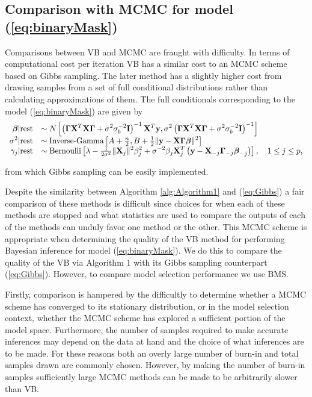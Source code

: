 \documentclass[11pt]{article}
\newtheorem{Main Result}{Main Result}
\def\vectorfontone{\bf}
\def\vectorfonttwo{\boldsymbol}
\def\vy{{\vectorfontone y}}                      %
\def\vbeta{{\vectorfonttwo \beta}}               %
\def\matrixfontone{\bf}
\def\matrixfonttwo{\boldsymbol}
\def\mI{{\matrixfontone I}}                      %
\def\mX{{\matrixfontone X}}                      %
\def\mGamma{{\matrixfonttwo \Gamma}}             %
\def\ds{\displaystyle}
\newcommand{\joc}[1]{{\color{black}#1}}
\begin{document}
 

 
\subsection{Comparison with MCMC for model (\ref{eq:binaryMask})}
\label{sec:Comparison}

Comparisons between VB and MCMC are fraught with difficulty. In terms of
computational cost per iteration VB has a similar cost to an MCMC scheme based
on Gibbs sampling. The later method has a slightly higher cost from drawing
samples from a set of full conditional distributions rather than calculating
approximations of them. The full conditionals corresponding to the model
(\ref{eq:binaryMask}) are given by
\begin{equation}\label{eq:Gibbs}
\begin{array}{rl}
\ds \vbeta|\mbox{rest}
    & \ds \sim N\left[
\left( \mGamma\mX^T\mX\mGamma + \sigma^2\sigma_b^{-2}\mI \right)^{-1}\mX^T\vy, \sigma^2\left( \mGamma\mX^T\mX\mGamma + \sigma^2\sigma_b^{-2}\mI \right)^{-1}
\right]
\\
\ds \sigma^2|\mbox{rest}
    & \ds \sim \mbox{Inverse-Gamma}\left[
A + \tfrac{n}{2},
B + \tfrac{1}{2}\| \vy - \mX\mGamma\vbeta \|^2
\right]
\\
\ds \gamma_j|\mbox{rest}
    & \ds \sim \mbox{Bernoulli}\left[
\lambda
- \tfrac{1}{2\sigma^2}\|\mX_j\|^2\beta_j^2
+ \sigma^{-2}\beta_j\mX_j^T\left(\vy -\mX_{-j}\mGamma_{-j}\vbeta_{-j}\right)
\right], \quad 1\le j\le p,
\end{array}
\end{equation}

\noindent from which Gibbs sampling can be easily implemented.


Despite the
similarity between Algorithm \ref{alg:Algorithm1} and (\ref{eq:Gibbs}) a fair
comparison of these methods is difficult since choices for when each of these
methods are stopped and what statistics are used to compare the outputs of each
of the methods can unduly favor one method or the other. This MCMC scheme is
appropriate when determining the quality of the VB method
for performing Bayesian inference for model (\ref{eq:binaryMask}). \joc{We do this
to compare
the quality of the VB via Algorithm 1 with its Gibbs sampling counterpart (\ref{eq:Gibbs}).
However,  
to compare model selection performance we use BMS. }

Firstly, comparison is hampered by the difficultly to determine whether a MCMC
scheme has converged to its stationary distribution, or in the model selection
context, whether the MCMC scheme has explored a sufficient portion of the model
space. Furthermore, the number of samples required to make accurate inferences
may depend on the data at hand and the choice of what inferences are to be made.
For these reasons both an overly large number of burn-in and total samples drawn
are commonly chosen. However, by making the number of burn-in samples
sufficiently large MCMC methods can be made to be arbitrarily slower than VB.
\end{document}
